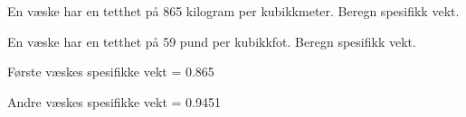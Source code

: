 

En væske har en tetthet på 865 kilogram per kubikkmeter.  Beregn spesifikk vekt.

\vskip 10pt

En væske har en tetthet på 59 pund per kubikkfot.  Beregn spesifikk vekt.

\vskip 10pt







Første væskes spesifikke vekt = 0.865

\vskip 10pt

Andre væskes spesifikke vekt = 0.9451









